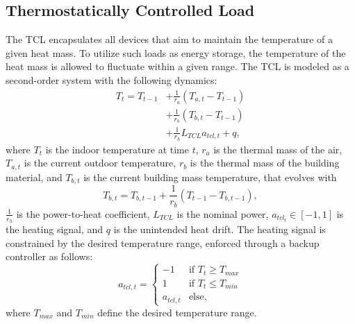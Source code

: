 \subsection{Thermostatically Controlled Load}\label{ssec:tcl}
The TCL encapsulates all devices that aim to maintain the temperature of a given heat mass. To utilize such loads as energy storage, the temperature of the heat mass is allowed to fluctuate within a given range. The TCL is modeled as a second-order system \cite{Sonderegger.1978} with the following dynamics:
\begin{equation}
    \begin{split}
        T_t = T_{t-1} &+ \frac{1}{r_a} (T_{a, t} - T_{t-1}) \\
        &+ \frac{1}{r_b} (T_{b,t} - T_{t-1}) \\
        &+ \frac{1}{r_h} L_{TCL} a_{tcl,t} + q,
    \end{split}
\end{equation}
where $T_t$ is the indoor temperature at time $t$, $r_a$ is the thermal mass of the air, $T_{a, t}$ is the current outdoor temperature, $r_b$ is the thermal mass of the building material, and $T_{b, t}$ is the current building mass temperature, that evolves with
\begin{equation}
    T_{b, t} = T_{b, t-1} + \frac{1}{r_b} (T_{t-1} - T_{b, t-1}),
\end{equation}
$\frac{1}{r_h}$ is the power-to-heat coefficient, $L_{TCL}$ is the nominal power, 
$a_{tcl_t} \in [-1, 1]$ is the heating signal, and $q$ is the unintended heat drift. The heating signal is constrained by the desired temperature range, enforced through a backup controller as follows:
\begin{equation}
    a_{tcl, t} = \begin{cases}
        -1 & \text{if } T_t \geq T_{max} \\
        1 & \text{if } T_t \leq T_{min} \\
        a_{tcl, t} & \text{else,} 
    \end{cases}
\end{equation}
where $T_{max}$ and $T_{min}$ define the desired temperature range. 


